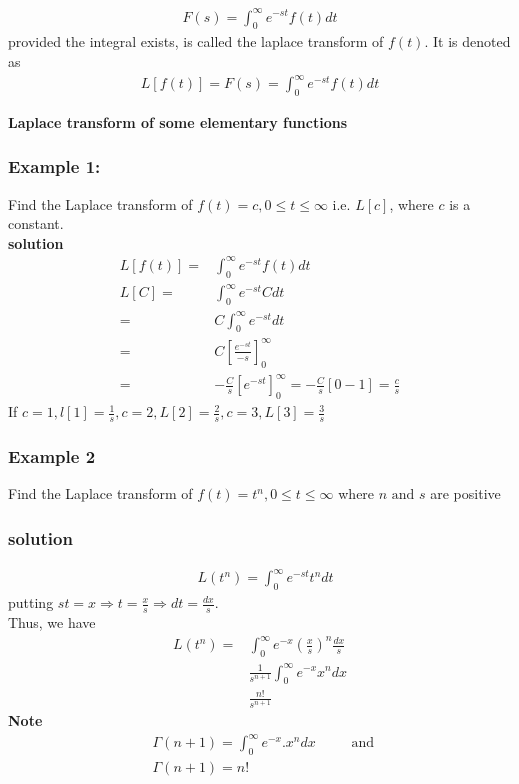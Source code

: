 \documentclass[12pt]{report}
\begin{document}
\begin{align*}
F(s)= \int^\infty_0 e^{-st}f(t)dt
\end{align*}
provided the integral exists, is called the laplace transform of $f(t)$. It is denoted as
\begin{align*}
L[f(t)]=F(s)= \int^\infty_0 e^{-st}f(t)dt
\end{align*}

\textbf{Laplace transform of some elementary functions}
\subsubsection{Example 1:} Find the Laplace transform of $f(t)=c, 0 \leq t \leq \infty$ i.e. $L[c]$, where $c$ is a constant.
\\ \textbf{solution} \\
\begin{align*}
L[f(t)]=&\int^\infty_0 e^{-st}f(t)dt \\
L[C]=&\int^\infty_0 e^{-st}C dt \\
=& C\int^\infty_0 e^{-st}dt \\
=& C \left[\frac{e^{-st}}{-s} \right]_0^\infty \\
=& -\frac{C}{s} \left[e^{-st}\right]_0^\infty = -\frac{C}{s}\left[0-1\right]= \frac{c}{s}
\end{align*}
If $c=1, l[1]= \frac{1}{s}, c=2, L[2] = \frac{2}{s}, c=3, L[3]=\frac{3}{s}$
\subsubsection{Example 2}
Find the Laplace transform of $f(t)=t^n, 0 \leq t \leq \infty $ where $n \mbox{ and } s$ are positive
\subsubsection{solution} 
\begin{align*}
&L(t^n)= \int_0^\infty e^{-st}t^n dt
\end{align*}
putting $st=x \Rightarrow t=\frac{x}{s} \Rightarrow dt= \frac{dx}{s}$. \\
Thus, we have
\begin{align*}
L(t^n)=& \int_0^\infty e^{-x}\left(\frac{x}{s}\right)^n \frac{dx}{s} \\
& \frac{1}{s^{n+1}} \int_0^\infty e^{-x}x^ndx \\
& \frac{n!}{s^{n+1}}
\end{align*}
\textbf{Note}
\begin{align*}
&\Gamma(n+1) = \int_0^\infty e^{-x}.x^n dx ~~~~~~~~~~\mbox{ and } \\
&\Gamma(n+1) = n!
\end{align*}
\end{document}
